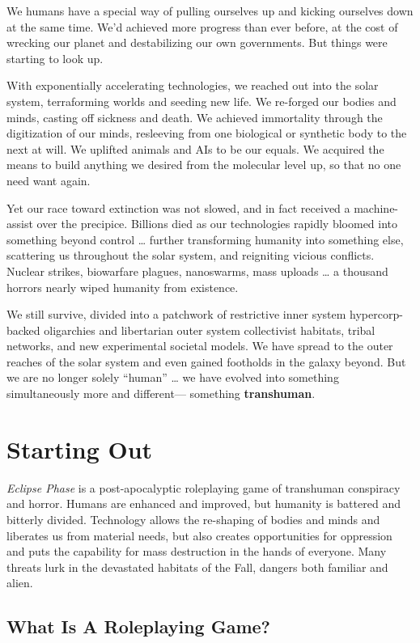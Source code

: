 We humans have a special way of pulling ourselves up 
and kicking ourselves down at the same time. We'd 
achieved more progress than ever before, at the cost 
of wrecking our planet and destabilizing our own 
governments. But things were starting to look up.

With exponentially accelerating technologies, we 
reached out into the solar system, terraforming worlds 
and seeding new life. We re-forged our bodies and 
minds, casting off sickness and death. We achieved 
immortality through the digitization of our minds, 
resleeving from one biological or synthetic body to 
the next at will. We uplifted animals and AIs to be our 
equals. We acquired the means to build anything we 
desired from the molecular level up, so that no one 
need want again.

Yet our race toward extinction was not slowed, and 
in fact received a machine-assist over the precipice. 
Billions died as our technologies rapidly bloomed into 
something beyond control … further transforming 
humanity into something else, scattering us throughout the solar system, and reigniting vicious conflicts. 
Nuclear strikes, biowarfare plagues, nanoswarms, 
mass uploads … a thousand horrors nearly wiped 
humanity from existence.

We still survive, divided into a patchwork of restrictive inner system hypercorp-backed oligarchies and 
libertarian outer system collectivist habitats, tribal 
networks, and new experimental societal models. We 
have spread to the outer reaches of the solar system 
and even gained footholds in the galaxy beyond. But 
we are no longer solely ``human'' … we have evolved 
into something simultaneously more and different—
something \textbf{transhuman}.

\section{Starting Out}

\textit{Eclipse Phase} is a post-apocalyptic roleplaying game 
of transhuman conspiracy and horror. Humans are 
enhanced and improved, but humanity is battered and 
bitterly divided. Technology allows the re-shaping of 
bodies and minds and liberates us from material needs, 
but also creates opportunities for oppression and puts 
the capability for mass destruction in the hands of everyone. Many threats lurk in the devastated habitats of 
the Fall, dangers both familiar and alien.

\subsection{What Is A Roleplaying Game?}

